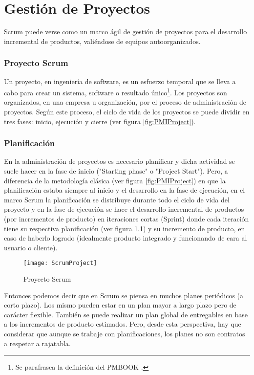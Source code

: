 \chapter{Gestión de Proyectos}

Scrum puede verse como un marco ágil de gestión de proyectos para el desarrollo incremental de productos, valiéndose de equipos autoorganizados. 



\subsection{Proyecto Scrum}

Un proyecto, en ingeniería de software, es un esfuerzo temporal que se lleva a cabo para crear un sistema, software o resultado único\footnote{Se parafrasea la definición del PMBOOK \cite{PMBOK-2004}.}. Los proyectos son organizados, en una empresa u organización, por el proceso de administración de proyectos. Según este proceso, el ciclo de vida de los proyectos se puede dividir en tres fases: inicio, ejecución y cierre (ver figura \ref{fig:PMIProject}). 

\subsection{Planificación}

En la administración de proyectos es necesario planificar y dicha actividad se suele hacer en la fase de inicio ("Starting phase" o "Project Start"). Pero, a diferencia de la metodología clásica (ver figura \ref{fig:PMIProject}) en que la planificación estaba siempre al inicio y el desarrollo en la fase de ejecución, en el marco Scrum la planificación se distribuye durante todo el ciclo de vida del proyecto y en la fase de ejecución se hace el desarrollo incremental de productos (por incrementos de producto) en iteraciones cortas (Sprint) donde cada iteración tiene su respectiva planificación (ver figura \ref{fig:ScrumProject}) y su incremento de producto, en caso de haberlo logrado (idealmente producto integrado y funcionando de cara al usuario o cliente).

\begin{figure}[h]
  \centering
  \texttt{[image: ScrumProject]}
  \caption{Proyecto Scrum}
  \centering
  \label{fig:ScrumProject} %
\end{figure}

Entonces podemos decir que en Scrum se piensa en muchos planes periódicos (a corto plazo). Los mismo pueden estar en un plan mayor a largo plazo pero de carácter flexible. También se puede realizar un plan global de entregables en base a los incrementos de producto estimados. Pero, desde esta perspectiva, hay que considerar que aunque se trabaje con planificaciones, los planes no son contratos a respetar a rajatabla.

